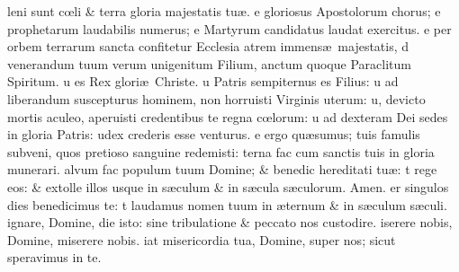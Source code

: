 \documentclass[letter,11pt]{book}
\begin{document}
\begin{multicols*}{2}
leni sunt c\oe li \& terra gloria majestatis tu\ae .
e gloriosus Apostolorum chorus;
e prophetarum laudabilis numerus;
e Martyrum candidatus laudat exercitus.
e per orbem terrarum sancta confitetur Ecclesia
atrem immens\ae \ majestatis,
d venerandum tuum verum unigenitum Filium,
anctum quoque Paraclitum Spiritum.
u es Rex glori\ae \ Christe.
u Patris sempiternus es Filius:
u ad liberandum suscepturus hominem, non horruisti Virginis uterum:
u, devicto mortis aculeo, aperuisti credentibus te regna c\oe lorum:
u ad dexteram Dei sedes in gloria Patris:
udex crederis esse venturus.
e ergo qu\ae sumus; tuis famulis subveni, quos pretioso sanguine redemisti:
\newline {\color{Red} \AE }terna fac cum sanctis tuis in gloria munerari.%
alvum fac populum tuum Domine; \& benedic hereditati tu\ae :
t rege eos: \& extolle illos usque in s\ae culum \& in s\ae cula s\ae culorum. Amen.
er singulos dies benedicimus te:
t laudamus nomen tuum in \ae ternum \& in s\ae culum s\ae culi.
ignare, Domine, die isto: sine tribulatione \& peccato nos custodire.
iserere nobis, Domine, miserere nobis.
iat misericordia tua, Domine, super nos; sicut speravimus in te.

\end{multicols*}
\end{document}
